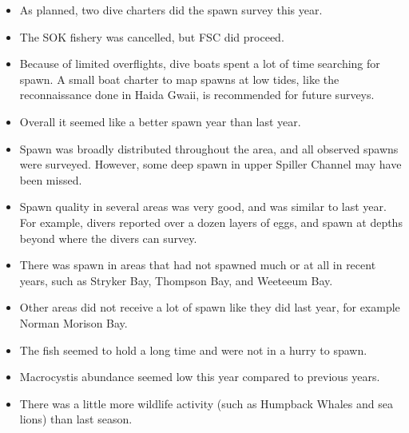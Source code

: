 \begin{itemize}

\item As planned, two dive charters did the spawn survey this year.

\item The SOK fishery was cancelled, but FSC did proceed.

\item Because of limited overflights, dive boats spent a lot of time searching for spawn.
A small boat charter to map spawns at low tides, like the reconnaissance done in Haida Gwaii, is recommended for future surveys.

\item Overall it seemed like a better spawn year than last year.

\item Spawn was broadly distributed throughout the area, and all observed spawns were surveyed.
However, some deep spawn in upper Spiller Channel may have been missed.

\item Spawn quality in several areas was very good, and was similar to last year.
For example, divers reported over a dozen layers of eggs, and spawn at depths beyond where the divers can survey.

\item There was spawn in areas that had not spawned much or at all in recent years, such as Stryker Bay, Thompson Bay, and Weeteeum Bay.

\item Other areas did not receive a lot of spawn like they did last year, for example Norman Morison Bay.

\item The fish seemed to hold a long time and were not in a hurry to spawn.

\item Macrocystis abundance seemed low this year compared to previous years.

\item There was a little more wildlife activity (such as Humpback Whales and sea lions) than last season.

\end{itemize}
